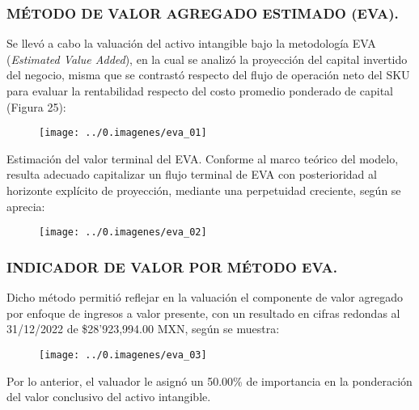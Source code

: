 \begin{rightcolumn}


\subsubsection*{MÉTODO DE VALOR AGREGADO ESTIMADO (EVA).}

Se llevó a cabo la valuación del activo intangible bajo la metodología EVA (\textit{Estimated Value Added}), en la cual se analizó la proyección del capital invertido del negocio, misma que se contrastó respecto del flujo de operación neto del SKU para evaluar la rentabilidad respecto del costo promedio ponderado de capital (Figura 25):

\begin{figure}[H]
\centering
\texttt{[image: ../0.imagenes/eva\_01]}
\end{figure}

\textcolor{principal}{Estimación del valor terminal del EVA.} Conforme al marco teórico del modelo, resulta adecuado capitalizar un flujo terminal de EVA con posterioridad al horizonte explícito de proyección, mediante una perpetuidad creciente, según se aprecia:

\begin{figure}[H]
\centering
\texttt{[image: ../0.imagenes/eva\_02]}
\end{figure}

\subsubsection*{INDICADOR DE VALOR POR MÉTODO EVA.}

Dicho método permitió reflejar en la valuación el componente de valor agregado por enfoque de ingresos a valor presente,  con un resultado en cifras redondas al 31/12/2022 de \$28'923,994.00 MXN, según se muestra:

\begin{figure}[H]
\centering
\texttt{[image: ../0.imagenes/eva\_03]}
\end{figure}

Por lo anterior, el valuador le asignó un 50.00\% de importancia en la ponderación del valor conclusivo del activo intangible.


\end{rightcolumn}

